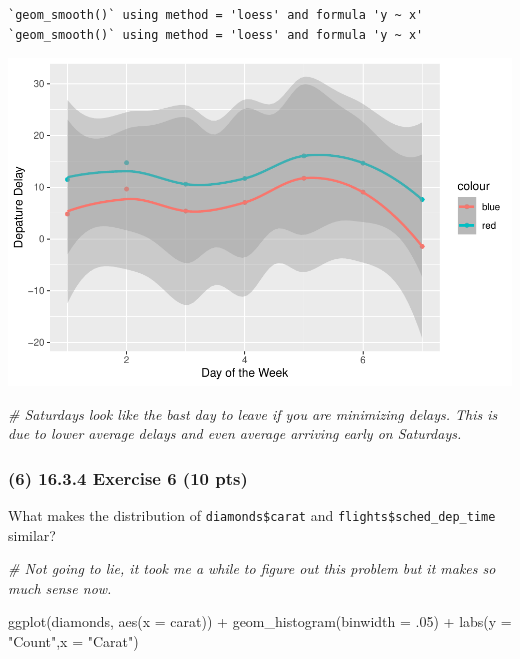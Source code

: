 \documentclass[
]{article}
\newenvironment{Shaded}{\begin{snugshade}}{\end{snugshade}}
\newcommand{\AttributeTok}[1]{\textcolor[rgb]{0.77,0.63,0.00}{#1}}
\newcommand{\CommentTok}[1]{\textcolor[rgb]{0.56,0.35,0.01}{\textit{#1}}}
\newcommand{\DecValTok}[1]{\textcolor[rgb]{0.00,0.00,0.81}{#1}}
\newcommand{\FunctionTok}[1]{\textcolor[rgb]{0.00,0.00,0.00}{#1}}
\newcommand{\NormalTok}[1]{#1}
\newcommand{\SpecialCharTok}[1]{\textcolor[rgb]{0.00,0.00,0.00}{#1}}
\newcommand{\StringTok}[1]{\textcolor[rgb]{0.31,0.60,0.02}{#1}}
\begin{document}
\begin{verbatim}
`geom_smooth()` using method = 'loess' and formula 'y ~ x'
`geom_smooth()` using method = 'loess' and formula 'y ~ x'
\end{verbatim}

\includegraphics{Midterm.sa_files/figure-latex/unnamed-chunk-7-1.pdf}

\begin{Shaded}
\begin{Highlighting}[]
\CommentTok{\# Saturdays look like the bast day to leave if you are minimizing delays. This is due to lower average delays and even average arriving early on Saturdays.}
\end{Highlighting}
\end{Shaded}

\hypertarget{exercise-6-10-pts}{%
\subsubsection{(6) 16.3.4 Exercise 6 (10 pts)}\label{exercise-6-10-pts}}

What makes the distribution of \texttt{diamonds\$carat} and
\texttt{flights\$sched\_dep\_time} similar?

\begin{Shaded}
\begin{Highlighting}[]
\CommentTok{\# Not going to lie, it took me a while to figure out this problem but it makes so much sense now.}

\FunctionTok{ggplot}\NormalTok{(diamonds, }\FunctionTok{aes}\NormalTok{(}\AttributeTok{x =}\NormalTok{ carat)) }\SpecialCharTok{+}
  \FunctionTok{geom\_histogram}\NormalTok{(}\AttributeTok{binwidth =}\NormalTok{ .}\DecValTok{05}\NormalTok{) }\SpecialCharTok{+} 
  \FunctionTok{labs}\NormalTok{(}\AttributeTok{y =} \StringTok{"Count"}\NormalTok{,}\AttributeTok{x =} \StringTok{"Carat"}\NormalTok{)}
\end{Highlighting}
\end{Shaded}
\end{document}
